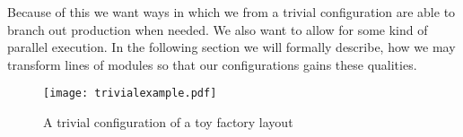 Because of this we want ways in which we from a trivial configuration are able to branch out production when needed. We also want to allow for some kind of parallel execution.  In the following section we will formally describe, how we may transform lines of modules so that our configurations gains these qualities.


\begin{figure}[h]
\centering
\texttt{[image: trivialexample.pdf]}
\caption{A trivial configuration of a toy factory layout}
\label{fig:trivial-example}
\end{figure}





